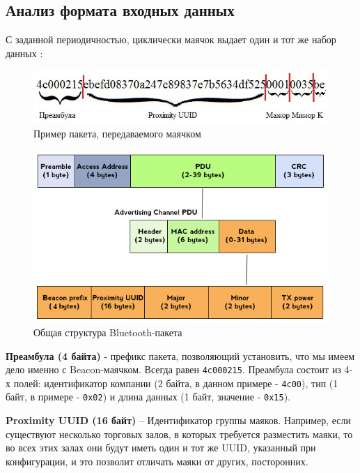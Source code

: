 \subsection{Анализ формата входных данных}

С заданной периодичностью, циклически маячок выдает один и тот же набор данных \cite{web:HabrBig, web:HabrIOS7}:

\begin{figure}[h!]
    \centering
    \includegraphics[width=\textwidth]{img/packageData}
    \caption{Пример пакета, передаваемого маячком}
\end{figure}

\begin{figure}[h!]
    \centering
    \includegraphics[width=\textwidth]{img/packageStructure}
    \caption{Общая структура Bluetooth-пакета}
\end{figure}

\textbf{Преамбула (4 байта)} - префикс пакета, позволяющий установить, что мы имеем дело именно с Beacon-маячком. Всегда равен \texttt{4c000215}. Преамбула состоит из 4-х полей: идентификатор компании (2 байта, в данном примере - \texttt{4c00}), тип (1 байт, в примере - \texttt{0x02}) и длина данных (1 байт, значение - \texttt{0x15}).

\textbf{Proximity UUID (16 байт)} – Идентификатор группы маяков. Например, если существуют несколько торговых залов, в которых требуется разместить маяки, то во всех этих залах они будут иметь один и тот же UUID, указанный при конфигурации, и это позволит отличать маяки от других, посторонних.

